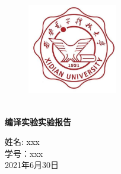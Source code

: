 \documentclass{article}
\begin{document}
\pagestyle{empty}
\begin{figure}
    \centering
    \includegraphics[width=0.35\textwidth]{xdu.jpeg}
\end{figure}

\begin{spacing}{3.0}
    \centering
    \ \\
    \textbf{\Huge 编译实验实验报告}

    \Large 姓名: xxx \\ 学号：xxx \\ 2021年6月30日
\end{spacing}
\newpage 

\setcounter{secnumdepth}{4} 
\setcounter{tocdepth}{4}  
\begin{spacing}{2.0}
    \tableofcontents
\end{spacing}
\newpage
\end{document}
